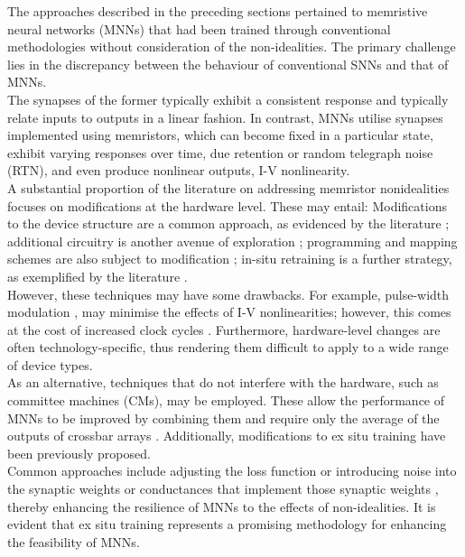 The approaches described in the preceding sections pertained to memristive neural networks (MNNs) that had been trained through conventional methodologies without consideration of the non-idealities. The primary challenge lies in the discrepancy between the behaviour of conventional SNNs and that of MNNs. \\

\noindent The synapses of the former typically exhibit a consistent response and typically relate inputs to outputs in a linear fashion. In contrast, MNNs utilise synapses implemented using memristors, which can become fixed in a particular state, exhibit varying responses over time, due retention or random telegraph noise (RTN), and even produce nonlinear outputs, I-V nonlinearity. \\

\noindent A substantial proportion of the literature on addressing memristor nonidealities focuses on modifications at the hardware level. These may entail: Modifications to the device structure are a common approach, as evidenced by the literature \cite{fang2018improvement}; additional circuitry is another avenue of exploration \cite{ambrogio2018equivalent, li2018analogue}; programming and mapping schemes are also subject to modification \cite{xia2017stuck}; in-situ retraining is a further strategy, as exemplified by the literature \cite{chen2017accelerator, jain2019cxdnn, wang2020ssm, li2019build}.\\

\noindent However, these techniques may have some drawbacks. For example, pulse-width modulation \cite{amirsoleimani2020memory}, may minimise the effects of I-V nonlinearities; however, this comes at the cost of increased clock cycles \cite{cai2019fully}. Furthermore, hardware-level changes are often technology-specific, thus rendering them difficult to apply to a wide range of device types.\\

\noindent As an alternative, techniques that do not interfere with the hardware, such as committee machines (CMs), may be employed. These allow the performance of MNNs to be improved by combining them and require only the average of the outputs of crossbar arrays \cite{joksas2020committee}. Additionally, modifications to ex situ training have been previously proposed. \\

\noindent Common approaches include adjusting the loss function \cite{zhu2020statistical} or introducing noise into the synaptic weights \cite{he2019noise} or conductances that implement those synaptic weights \cite{joshi2020accurate}, thereby enhancing the resilience of MNNs to the effects of non-idealities. It is evident that ex situ training represents a promising methodology for enhancing the feasibility of MNNs.\\

